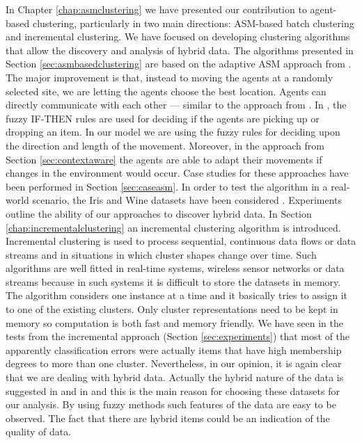 In Chapter \ref{chap:asmclustering} we have presented our contribution to agent-based clustering, particularly in two main directions: ASM-based batch clustering and incremental clustering. We have focused on developing clustering algorithms that allow the discovery and analysis of hybrid data. 
The algorithms presented in Section \ref{sec:asmbasedclustering} are based on the adaptive ASM approach from \cite{Chen04AnAdaptive}. The major improvement is that, instead to moving the agents at a randomly selected site, we are letting the agents choose the best location. Agents can directly communicate with each other --- similar to the approach from \cite{Chira07Stigmergic}. In \cite{Schockaert04Fuzzy}, the fuzzy IF-THEN rules are used for deciding if the agents are picking up or dropping an item. In our model we are using the fuzzy rules for deciding upon the direction and length of the movement. Moreover, in the approach from Section \ref{sec:contextaware} the agents are able to adapt their movements if changes in the environment would occur. Case studies for these approaches have been performed in Section \ref{sec:caseasm}. In order to test the algorithm in a real-world scenario, the Iris and Wine datasets have been considered \cite{website:iris, website:wine}. Experiments outline the ability of our approaches to discover hybrid data. 
In Section \ref{chap:incrementalclustering} an incremental clustering algorithm is introduced. Incremental clustering is used to process sequential, continuous data flows or data streams and in situations in which cluster shapes change over time. Such algorithms are well fitted in real-time systems, wireless sensor networks or data streams because in such systems it is difficult to store the datasets in memory. The algorithm considers one instance at a time and it basically tries to assign it to one of the existing clusters. Only cluster representations need to be kept in memory so computation is both fast and memory friendly. 
We have seen in the tests from the incremental approach (Section \ref{sec:experiments}) that most of the apparently classification errors were actually items that have high membership degrees to more than one cluster. Nevertheless, in our opinion, it is again clear that we are dealing with hybrid data. Actually the hybrid nature of the data is suggested in \cite{website:iris} and in \cite{website:wine} and this is the main reason for choosing these datasets for our analysis. By using fuzzy methods such features of the data are easy to be observed. The fact that there are hybrid items could be an indication of the quality of data.

